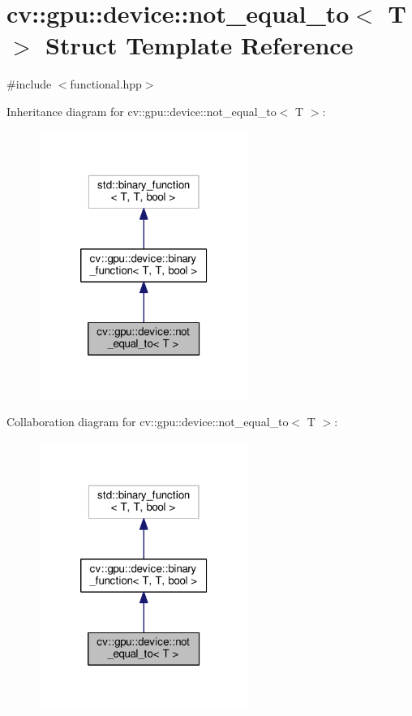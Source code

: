 \hypertarget{structcv_1_1gpu_1_1device_1_1not__equal__to}{\section{cv\-:\-:gpu\-:\-:device\-:\-:not\-\_\-equal\-\_\-to$<$ T $>$ Struct Template Reference}
\label{structcv_1_1gpu_1_1device_1_1not__equal__to}
}


{\ttfamily \#include $<$functional.\-hpp$>$}



Inheritance diagram for cv\-:\-:gpu\-:\-:device\-:\-:not\-\_\-equal\-\_\-to$<$ T $>$\-:\nopagebreak
\begin{figure}[H]
\begin{center}
\leavevmode
\includegraphics[width=194pt]{structcv_1_1gpu_1_1device_1_1not__equal__to__inherit__graph}
\end{center}
\end{figure}


Collaboration diagram for cv\-:\-:gpu\-:\-:device\-:\-:not\-\_\-equal\-\_\-to$<$ T $>$\-:\nopagebreak
\begin{figure}[H]
\begin{center}
\leavevmode
\includegraphics[width=194pt]{structcv_1_1gpu_1_1device_1_1not__equal__to__coll__graph}
\end{center}
\end{figure}
